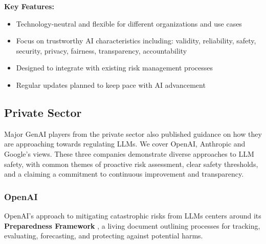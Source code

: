 \textbf{Key Features:}
\begin{itemize}
    \item Technology-neutral and flexible for different organizations and use cases
    \item Focus on trustworthy AI characteristics including: validity, reliability, safety, security, privacy, fairness, transparency, accountability
    \item Designed to integrate with existing risk management processes
    \item Regular updates planned to keep pace with AI advancement
\end{itemize}

\subsection{Private Sector}

Major GenAI players from the private sector also published guidance on how they are approaching towards regulating LLMs. We cover OpenAI, Anthropic and Google's views. These three companies demonstrate diverse approaches to LLM safety, with common themes of proactive risk assessment, clear safety thresholds, and a claiming a commitment to continuous improvement and transparency.

\subsubsection{OpenAI}

OpenAI's approach to mitigating catastrophic risks from LLMs centers around its \textbf{Preparedness Framework} , a living document outlining processes for tracking, evaluating, forecasting, and protecting against potential harms.  

